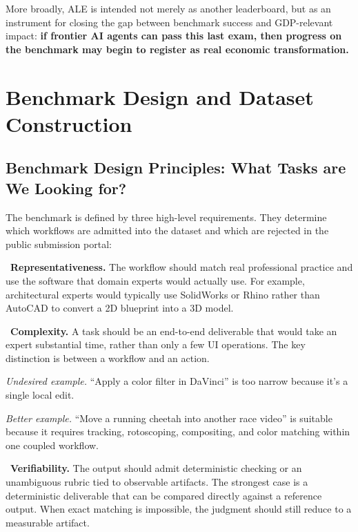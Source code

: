 \documentclass{llmxive}
\begin{document}
More broadly, ALE is intended not merely as another leaderboard, but as an instrument for closing the gap between benchmark success and GDP-relevant impact: \textbf{if frontier AI agents can pass this last exam, then progress on the benchmark may begin to register as real economic transformation.}

\vspace{-0.6em}
\section{Benchmark Design and Dataset Construction}
\label{sec:dataset}
\vspace{-0.6em}
\subsection{Benchmark Design Principles: What Tasks are We Looking for?}
\label{sec:design-principles}

The benchmark is defined by three high-level requirements. They determine which workflows are
admitted into the dataset and which are rejected in the public submission portal:

\noindent \textbullet\ \textbf{Representativeness.} The workflow should match real professional practice and use the software that domain experts would actually use. 
\noindent For example, architectural experts would typically use \colorbox{green!8}{SolidWorks or Rhino} rather than \colorbox{red!8}{AutoCAD} to convert a 2D blueprint into a 3D model.

\noindent \textbullet\ \textbf{Complexity.} A task should be an end-to-end deliverable that would take an expert substantial time, rather than only a few UI operations. The key distinction is between a workflow and an action.

\noindent \colorbox{red!8}{\parbox{\dimexpr\linewidth-2\fboxsep\relax}{\textit{Undesired example.} ``Apply a color filter in DaVinci'' is too narrow because it's a single local edit.}}

\noindent \colorbox{green!8}{\parbox{\dimexpr\linewidth-2\fboxsep\relax}{\textit{Better example.} ``Move a running cheetah into another race video'' is suitable because it requires tracking, rotoscoping, compositing, and color matching within one coupled workflow.}}

\noindent \textbullet\ \textbf{Verifiability.} The output should admit deterministic checking or an unambiguous rubric tied to observable artifacts. The strongest case is a deterministic deliverable that can be compared directly against a reference output. When exact matching is impossible, the judgment should still reduce to a measurable artifact.
\end{document}
